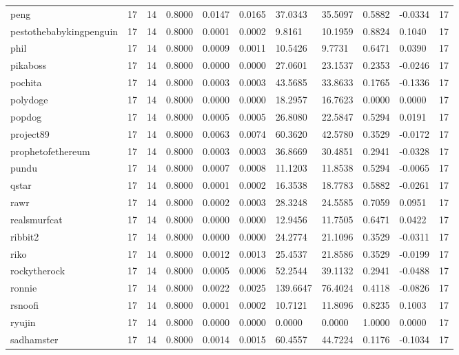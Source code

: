 \begin{table}[htbp]
\begin{tabular}{lllllllllll}
peng & 17 & 14 & 0.8000 & 0.0147 & 0.0165 & 37.0343 & 35.5097 & 0.5882 & -0.0334 & 17 \\
pestothebabykingpenguin & 17 & 14 & 0.8000 & 0.0001 & 0.0002 & 9.8161 & 10.1959 & 0.8824 & 0.1040 & 17 \\
phil & 17 & 14 & 0.8000 & 0.0009 & 0.0011 & 10.5426 & 9.7731 & 0.6471 & 0.0390 & 17 \\
pikaboss & 17 & 14 & 0.8000 & 0.0000 & 0.0000 & 27.0601 & 23.1537 & 0.2353 & -0.0246 & 17 \\
pochita & 17 & 14 & 0.8000 & 0.0003 & 0.0003 & 43.5685 & 33.8633 & 0.1765 & -0.1336 & 17 \\
polydoge & 17 & 14 & 0.8000 & 0.0000 & 0.0000 & 18.2957 & 16.7623 & 0.0000 & 0.0000 & 17 \\
popdog & 17 & 14 & 0.8000 & 0.0005 & 0.0005 & 26.8080 & 22.5847 & 0.5294 & 0.0191 & 17 \\
project89 & 17 & 14 & 0.8000 & 0.0063 & 0.0074 & 60.3620 & 42.5780 & 0.3529 & -0.0172 & 17 \\
prophetofethereum & 17 & 14 & 0.8000 & 0.0003 & 0.0003 & 36.8669 & 30.4851 & 0.2941 & -0.0328 & 17 \\
pundu & 17 & 14 & 0.8000 & 0.0007 & 0.0008 & 11.1203 & 11.8538 & 0.5294 & -0.0065 & 17 \\
qstar & 17 & 14 & 0.8000 & 0.0001 & 0.0002 & 16.3538 & 18.7783 & 0.5882 & -0.0261 & 17 \\
rawr & 17 & 14 & 0.8000 & 0.0002 & 0.0003 & 28.3248 & 24.5585 & 0.7059 & 0.0951 & 17 \\
realsmurfcat & 17 & 14 & 0.8000 & 0.0000 & 0.0000 & 12.9456 & 11.7505 & 0.6471 & 0.0422 & 17 \\
ribbit2 & 17 & 14 & 0.8000 & 0.0000 & 0.0000 & 24.2774 & 21.1096 & 0.3529 & -0.0311 & 17 \\
riko & 17 & 14 & 0.8000 & 0.0012 & 0.0013 & 25.4537 & 21.8586 & 0.3529 & -0.0199 & 17 \\
rockytherock & 17 & 14 & 0.8000 & 0.0005 & 0.0006 & 52.2544 & 39.1132 & 0.2941 & -0.0488 & 17 \\
ronnie & 17 & 14 & 0.8000 & 0.0022 & 0.0025 & 139.6647 & 76.4024 & 0.4118 & -0.0826 & 17 \\
rsnoofi & 17 & 14 & 0.8000 & 0.0001 & 0.0002 & 10.7121 & 11.8096 & 0.8235 & 0.1003 & 17 \\
ryujin & 17 & 14 & 0.8000 & 0.0000 & 0.0000 & 0.0000 & 0.0000 & 1.0000 & 0.0000 & 17 \\
sadhamster & 17 & 14 & 0.8000 & 0.0014 & 0.0015 & 60.4557 & 44.7224 & 0.1176 & -0.1034 & 17 \\

\end{tabular}
\end{table}
